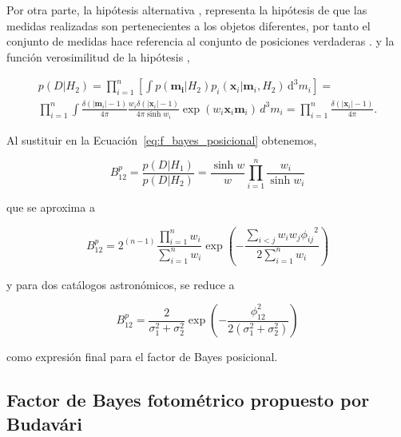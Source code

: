 Por otra parte, la hipótesis alternativa , representa la hipótesis de que las medidas realizadas son pertenecientes a los objetos diferentes, por tanto el conjunto de medidas  hace referencia al conjunto de posiciones verdaderas . y la función verosimilitud de la hipótesis ,

\begin{multline*}
    p(D|H_2)= \prod_{i=1}^{n} \left[ \int{p\left( \boldsymbol{m_i} | H_2 \right)  p_i\left(\boldsymbol{x}_i |\boldsymbol{m}_i,H_2 \right)\,\mathrm{d}^3m_i} \right]=\\
    \prod_{i=1}^{n} \int \frac{\delta (\left|\boldsymbol{m}_i \right|-1)}{4\pi} \frac{w_i \delta (\left|\boldsymbol{x}_i \right|-1)}{4\pi \sinh{w_i}} \exp{\left(w_i\boldsymbol{x}_i\boldsymbol{m}_i\right)}\,d^3m_i =\prod_{i=1}^{n}\frac{\delta (\left|\boldsymbol{x}_i \right|-1)}{4\pi}.
\end{multline*}

Al sustituir en la Ecuación~\ref{eq:f_bayes_posicional} obtenemos,

\begin{equation*}
    B_{12}^{p}=\frac{p(D|H_1)}{p(D|H_2)}= \frac{\sinh{w}}{w}\prod_{i=1}^{n}\frac{w_i}{\sinh{w_i}}
\end{equation*}

que se aproxima a

\begin{equation*}
    B_{12}^{p}=
    {2}^{(n-1)}\frac{{\prod_{i=1}^{n}{w_i}}}{ \sum_{i=1}^{n}{w_i}}\exp{\left(- \frac{ \sum_{i<j}{w_i w_j {{\phi}_{ij}}^{2}} }{2\sum_{i=1}^{n}{w_i}} \right)}
\end{equation*}

y para dos catálogos astronómicos, se reduce a

\begin{equation}\label{eq:bayes_posicional}
    B_{12}^{p}= \frac{2}{{\sigma}^2_1+{\sigma}^2_2}\exp{\left(- \frac{{\phi}^{2}_{12}}{2({\sigma}^2_1+{\sigma}^2_2)} \right)}
\end{equation}

como expresión final para el factor de Bayes posicional.

\subsection{Factor de Bayes fotométrico propuesto por Budavári}\label{sec:bayes_fotometrico}

